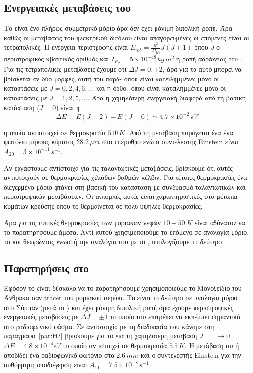 \documentclass[a4paper,12pt]{memoir}
\begin{document}
\subsection{Ενεργειακές μεταβάσεις του }
Το  είναι ένα πλήρως συμμετρικό μόριο άρα δεν έχει μόνιμη διπολική ροπή. Άρα καθώς οι μεταβάσεις του ηλεκτρικού διπόλου είναι απαγορευμένες οι επόμενες είναι οι τετραπολικές. 
Η ενέργεια περιστροφής είναι $E_{rot}=\frac{h^2}{2I_{H_2}}J(J+1)$ όπου $J$ ο περιστροφικός κβαντικός αριθμός και $I_{H_2}=5\times 10^{-48} \, kg\, m^2$ η ροπή αδράνειας του .
Για τις τετραπολικές μεταβάσεις έχουμε ότι $\Delta J =0,\pm 2$, άρα για το  αυτό μπορεί να βρίσκεται σε δύο μορφές, αυτή του παρά- όπου είναι κατειλημμένες μόνο οι καταστάσεις με $J=0,2,4,6,...$ και η όρθο- όπου είναι κατειλημμένες μόνο οι καταστάσεις με $J=1,2,5,...$. 
Άρα η χαμηλότερη ενεργειακή διαφορά από τη βασική κατάσταση ($J=0$) είναι η 
\begin{equation}
\Delta E=E(J=2)-E(J=0)\simeq 4.7\times 10^{-2}\, eV
\end{equation}

η οποία αντιστοιχεί σε θερμοκρασία $510 \,K$. Από τη μετάβαση παράγεται ένα ένα φωτόνιο μήκους κύματος $28.2\, \mu m$ στο υπέρυθρο ενώ ο συντελεστής Einstein είναι $A_{20}=3\times 10^{-11} \, s^{-1}$.

Αν εργαστούμε αντίστοιχα για τις ταλαντωτικές μεταβάσεις, βρίσκουμε ότι αυτές αντιστοιχούν σε θερμοκρασίες χιλιάδων βαθμών κέλβιν. Για τέτοιες θερμοκρασίες ένα διεγερμένο μόριο  φτάνει στη βασική του κατάσταση με συνδυασμό ταλαντωτικών και περιστροφικών μεταβάσεων. Οι εκπομπές αυτές είναι χαρακτηριστικές στα μέτωπα κυμάτων κρούσης όπου το  θερμαίνεται σε πολύ υψηλές θερμοκρασίες.

Άρα για τις τυπικές θερμοκρασίες των μοριακών νεφών $10-50\ K$ είναι αδύνατον να το παρατηρήσουμε άμεσα. Αντί αυτού χρησιμοποιούμε το επόμενο σε αναλογία μόριο, το  και θεωρώντας γνωστή την αναλόγια του με το , υπολογίζουμε το δεύτερο. 

\subsection{Παρατηρήσεις στο  }
\label{par:criticaldensity}
Εφόσον το  είναι δύσκολο να το παρατηρήσουμε χρησιμοποιούμε το Μονοξείδιο του Άνθρακα  σαν tracer  του μοριακού αερίου. Το  είναι το δεύτερο σε αναλογία μόριο στο Σύμπαν (μετά το ) και έχει μόνιμη διπολική ροπή άρα έχουμε περιστροφικές ενεργειακές μεταβάσεις με $\Delta J=\pm 1$ το οποίο του επιτρέπει να εκπέμπει σημαντικά στο ραδιοφωνικό φάσμα. 
Σε αντιστοιχία με τη διαδικασία που κάναμε στη παράγραφο~\ref{par:H2} βρίσκουμε για το  για τη χαμηλότερη μετάβαση $J=1\rightarrow 0$ $\Delta E=4.8\times 10^{-4} eV$ το οποίο αντιστοιχεί σε θερμοκρασία $5.5 \, K$. Η μετάβαση αυτή αποδίδει ένα ραδιοφωνικό φωτόνιο στα $2.6 \, mm$ και ο συντελεστής Einstein για την αυθόρμητη αποδιέγερση είναι $A_{10}=7.5\times 10^{-8} \, s^{-1}$.
\end{document}
